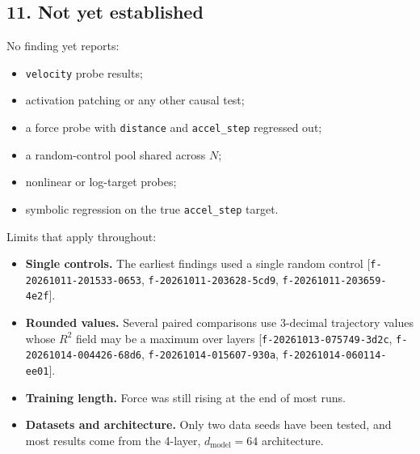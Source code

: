 \documentclass{article}
\begin{document}
\subsection{11. Not yet established}

No finding yet reports:

\begin{itemize}
\item \texttt{velocity} probe results;
\item activation patching or any other causal test;
\item a force probe with \texttt{distance} and \texttt{accel\_step} regressed out;
\item a random-control pool shared across $N$;
\item nonlinear or log-target probes;
\item symbolic regression on the true \texttt{accel\_step} target.
\end{itemize}

Limits that apply throughout:

\begin{itemize}
\item \textbf{Single controls.} The earliest findings used a single random control [\texttt{f-20261011-201533-0653}, \texttt{f-20261011-203628-5cd9}, \texttt{f-20261011-203659-4e2f}].
\item \textbf{Rounded values.} Several paired comparisons use 3-decimal trajectory values whose $R^2$ field may be a maximum over layers [\texttt{f-20261013-075749-3d2c}, \texttt{f-20261014-004426-68d6}, \texttt{f-20261014-015607-930a}, \texttt{f-20261014-060114-ee01}].
\item \textbf{Training length.} Force was still rising at the end of most runs.
\item \textbf{Datasets and architecture.} Only two data seeds have been tested, and most results come from the 4-layer, $d_{\text{model}} = 64$ architecture.
\end{itemize}
\end{document}
